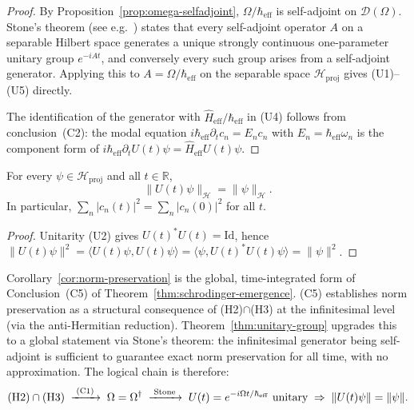     \begin{proof}
      By Proposition~\ref{prop:omega-selfadjoint}, $\Omega/\hbar_{\mathrm{eff}}$ is self-adjoint
      on $\mathcal{D}(\Omega)$.
      Stone's theorem (see e.g.~\cite{Reed1972}) states that every self-adjoint operator $A$
      on a separable Hilbert space generates a unique strongly continuous one-parameter
      unitary group $e^{-iAt}$, and conversely every such group arises from a self-adjoint
      generator.
      Applying this to $A = \Omega/\hbar_{\mathrm{eff}}$ on the separable space
      $\mathcal{H}_{\mathrm{proj}}$ gives (U1)--(U5) directly.

      The identification of the generator with $\hat{H}_{\mathrm{eff}}/\hbar_{\mathrm{eff}}$
      in (U4) follows from conclusion~(C2): the modal equation
      $i\hbar_{\mathrm{eff}}\partial_t c_n = E_n c_n$ with $E_n = \hbar_{\mathrm{eff}}\omega_n$
      is the component form of $i\hbar_{\mathrm{eff}}\partial_t U(t)\psi = \hat{H}_{\mathrm{eff}}
      U(t)\psi$.
    \end{proof}

    \begin{corollary}
      \label{cor:norm-preservation}
      For every $\psi \in \mathcal{H}_{\mathrm{proj}}$ and all $t \in \mathbb{R}$,
      \[
        \|U(t)\psi\|_{\mathcal{H}} = \|\psi\|_{\mathcal{H}}.
      \]
      In particular, $\sum_n |c_n(t)|^2 = \sum_n |c_n(0)|^2$ for all $t$.
    \end{corollary}

    \begin{proof}
      Unitarity (U2) gives $U(t)^*U(t) = \mathrm{Id}$, hence
      $\|U(t)\psi\|^2 = \langle U(t)\psi, U(t)\psi\rangle
      = \langle \psi, U(t)^*U(t)\psi\rangle = \|\psi\|^2$.
    \end{proof}

    \begin{remark}
      Corollary~\ref{cor:norm-preservation} is the global, time-integrated form of
      Conclusion~(C5) of Theorem~\ref{thm:schrodinger-emergence}.
      (C5) establishes norm preservation as a structural consequence of (H2)$\cap$(H3)
      at the infinitesimal level (via the anti-Hermitian reduction).
      Theorem~\ref{thm:unitary-group} upgrades this to a global statement via Stone's
      theorem: the infinitesimal generator being self-adjoint is sufficient to guarantee
      exact norm preservation for all time, with no approximation.
      The logical chain is therefore:
      \[
        \textup{(H2)} \cap \textup{(H3)}
        \;\xrightarrow{\;\textup{(C1)}\;}\;
        \Omega = \Omega^\dagger
        \;\xrightarrow{\;\textup{Stone}\;}\;
        U(t) = e^{-i\Omega t/\hbar_{\mathrm{eff}}} \textup{ unitary}
        \;\Rightarrow\;
        \|U(t)\psi\| = \|\psi\|.
      \]
    \end{remark}

